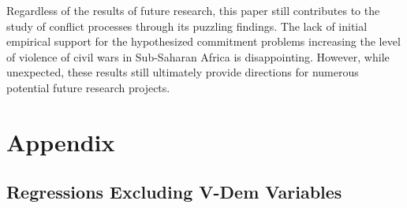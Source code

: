 \documentclass[12pt, letterpaper]{article}
\begin{document}
Regardless of the results of future research, this paper still contributes to the study of conflict processes through its puzzling findings. The lack of initial empirical support for the hypothesized commitment problems increasing the level of violence of civil wars in Sub-Saharan Africa is disappointing. However, while unexpected, these results still ultimately provide directions for numerous potential future research projects.	

	
	\newpage
	
	
\newpage

\section{Appendix}

\subsection{Regressions Excluding V-Dem Variables}
\end{document}

